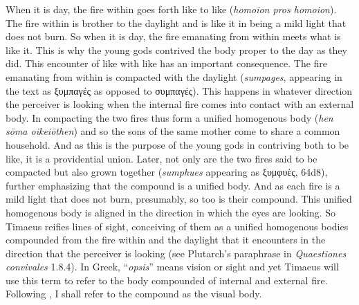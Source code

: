 When it is day, the fire within goes forth like to like (\emph{homoion pros homoion}). The fire within is brother to the daylight and is like it in being a mild light that does not burn. So when it is day, the fire emanating from within meets what is like it. This is why the young gods contrived the body proper to the day as they did. This encounter of like with like has an important consequence. The fire emanating from within is compacted with the daylight (\emph{sumpages}, appearing in the text as {\sbl ξυμπαγές} as opposed to {\sbl συμπαγές}). This happens in whatever direction the perceiver is looking when the internal fire comes into contact with an external body. In compacting the two fires thus form a unified homogenous body (\emph{hen sōma oikeiōthen}) and so the sons of the same mother come to share a common household. And as this is the purpose of the young gods in contriving both to be like, it is a providential union. Later, not only are the two fires said to be compacted but also grown together (\emph{sumphues} appearing as {\sbl ξυμφυὲς}, 64d8), further emphasizing that the compound is a unified body. And as each fire is a mild light that does not burn, presumably, so too is their compound. This unified homogenous body is aligned in the direction in which the eyes are looking. So Timaeus reifies lines of sight, conceiving of them as a unified homogenous bodies compounded from the fire within and the daylight that it encounters in the direction that the perceiver is looking (see Plutarch's paraphrase in \emph{Quaestiones convivales} 1.8.4). In Greek, ``\emph{opsis}'' means vision or sight and yet Timaeus will use this term to refer to the body compounded of internal and external fire. Following \citet[221]{Ierodiakonou:2005ly}, I shall refer to the compound as the visual body.



